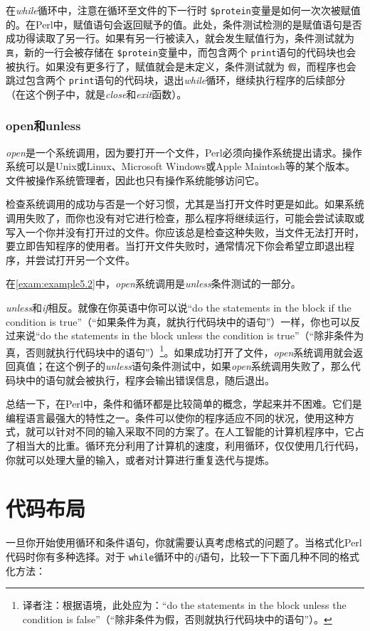 在\textit{while}循环中，注意在循环至文件的下一行时 \verb|$protein|变量是如何一次次被赋值的。在Perl中，赋值语句会返回赋予的值。此处，条件测试检测的是赋值语句是否成功得读取了另一行。如果有另一行被读入，就会发生赋值行为，条件测试就为 \verb|真|，新的一行会被存储在 \verb|$protein|变量中，而包含两个 \verb|print|语句的代码块也会被执行。如果没有更多行了，赋值就会是未定义，条件测试就为 \verb|假|，而程序也会跳过包含两个 \verb|print|语句的代码块，退出\textit{while}循环，继续执行程序的后续部分（在这个例子中，就是\textit{close}和\textit{exit}函数）。

\subsubsection{open和unless}
\textit{open}是一个系统调用，因为要打开一个文件，Perl必须向操作系统提出请求。操作系统可以是Unix或Linux、Microsoft Windows或Apple Maintosh等的某个版本。文件被操作系统管理者，因此也只有操作系统能够访问它。

检查系统调用的成功与否是一个好习惯，尤其是当打开文件时更是如此。如果系统调用失败了，而你也没有对它进行检查，那么程序将继续运行，可能会尝试读取或写入一个你并没有打开过的文件。你应该总是检查这种失败，当文件无法打开时，要立即告知程序的使用者。当打开文件失败时，通常情况下你会希望立即退出程序，并尝试打开另一个文件。

在\autoref{exam:example5.2}中，\textit{open}系统调用是\textit{unless}条件测试的一部分。

\textit{unless}和\textit{if}相反。就像在你英语中你可以说“do the statements in the block if the condition is true”（“如果条件为真，就执行代码块中的语句”）一样，你也可以反过来说“do the statements in the block unless the condition is true”（“除非条件为真，否则就执行代码块中的语句”）\footnote{译者注：根据语境，此处应为：“do the statements in the block unless the condition is false”（“除非条件为假，否则就执行代码块中的语句”）。}。如果成功打开了文件，\textit{open}系统调用就会返回真值；在这个例子的\textit{unless}语句条件测试中，如果\textit{open}系统调用失败了，那么代码块中的语句就会被执行，程序会输出错误信息，随后退出。

总结一下，在Perl中，条件和循环都是比较简单的概念，学起来并不困难。它们是编程语言最强大的特性之一。条件可以使你的程序适应不同的状况，使用这种方式，就可以针对不同的输入采取不同的方案了。在人工智能的计算机程序中，它占了相当大的比重。循环充分利用了计算机的速度，利用循环，仅仅使用几行代码，你就可以处理大量的输入，或者对计算进行重复迭代与提炼。

\section{代码布局}
\label{sect:section5.2}
一旦你开始使用循环和条件语句，你就需要认真考虑格式的问题了。当格式化Perl代码时你有多种选择。对于 \verb|while|循环中的\textit{if}语句，比较一下下面几种不同的格式化方法：

